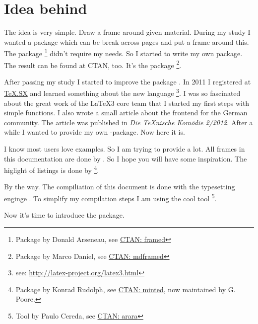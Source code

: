 \documentclass[openany,12pt,tocdepth=3]{ltx-md}
\begin{document}
\chapter{Idea behind \texorpdfstring{}{xframed}}\label{chap:idea}

The idea is very simple. Draw a frame around given material. During my study 
I wanted a package which can be break across pages and put a frame around this.
The package \footnote{Package  by Don­ald Arse­neau, 
see \href{http://www.ctan.org/pkg/framed}{CTAN: framed}} didn't require my needs.
So I started to write my own package. The result can be found at CTAN, too. It's the
package \footnote{Package  by Marco Daniel, 
see \href{http://www.ctan.org/pkg/mdframed}{CTAN: mdframed}}.

After passing my study I started to improve the package . In 2011 
I registered at \href{http://tex.stackexchange.com/}{TeX.SX}  and learned something
about the new language \footnote{see: 
\href{http://latex-project.org/latex3.html}{http://latex-project.org/latex3.html}}. 
I was so fascinated about the great work of the \LaTeX3 core team that I started 
my first steps with simple functions. I also wrote a small article about the 
frontend  for the German community. The article was published
in   \emph{Die \TeX nische Komödie 2/2012}. 
After a while I wanted to provide my own -package. Now here it is.

I know most users love examples. So I am trying to provide a lot. All
frames in this documentation are done by . So I hope
you will have some inspiration. The higlight of listings is done
by \footnote{Package  by Kon­rad Ru­dolph, 
see \href{http://www.ctan.org/pkg/minted}{CTAN: minted}, now maintained by G. Poore.}.

\vfill
By the way. The compiliation of this document is done with the
typesetting enginge \LuaLaTeX. To simplify my compilation steps
I am using the cool tool \footnote{Tool  by Paulo Cereda, 
see \href{http://www.ctan.org/pkg/arara}{CTAN: arara}}.

\vfill
Now it's time to introduce the package.


\end{document}
